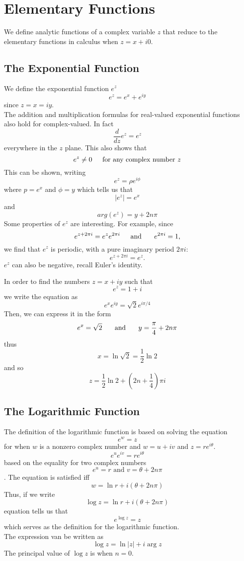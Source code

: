 \chapter{Elementary Functions}
We define analytic functions of a complex variable $ z $ that reduce to the elementary functions in calculus when $ z = x + i0 $. 

\section{The Exponential Function}
We define the exponential function $ e^z $
\[ e^z = e^x + e^{iy} \]
since $ z = x = iy $. \\
The addition and multiplication formulas for real-valued exponential functions also hold for complex-valued. In fact 
\[ \frac{d}{dz} e^z = e^z \] everywhere in the $ z $ plane. This also shows that 
\[ e^z \neq 0 \indent \text{for any complex number $ z $}\]
This can be shown, writing 
\[ e^z = \rho e^{i\phi} \] where $ p = e^x $ and $ \phi = y $
which tells us that 
\[ |e^z| = e^x \] and \[ arg(e^z) = y + 2n \pi \] 
Some properties of $ e^z $ are interesting. For example, since 
\[ e^{z+2\pi i} = e^z e^{2\pi i} \text{\indent and \indent }e^{2 \pi i}= 1,\]
we find that $ e^z $ is periodic, with a pure imaginary period $ 2 \pi i $: 
\[ e^{z+2 \pi i} = e^z. \]
$ e^z $ can also be negative, recall Euler's identity. 
\begin{example}
	In order to find the numbers $ z = x +iy $ such that \[ e^z = 1 + i \] we write the equation as 
	\[ e^xe^{iy} = \sqrt{2}e^{i \pi / 4} \] Then, we can express it in the form 
	\[ e^x = \sqrt{2} \text{ \indent and \indent} y = \dfrac{\pi}{4}+2n\pi\] 
	thus 
	\[ x = \ln \sqrt{2} = \dfrac{1}{2} \ln 2 \] and so 
	\[ z = \dfrac{1}{2} \ln 2 + \left(2n + \dfrac{1}{4}\right)\pi i \]
\end{example}
\section{The Logarithmic Function}
The definition of the logarithmic function is based on solving the equation 
\[ e^w = z \] for when $ w $ is a nonzero complex number and $ w = u + iv $ and $ z = re^{i \theta} $. \[ e^ue^{iv} = re^{i \theta} \] based on the equality for two complex numbers 
\[ e^u = r \text{  and  } v=\theta + 2n\pi \]. The equation is satisfied iff \[ w = \ln r + i(\theta + 2n \pi) \] Thus, if we write 
\[ \log z = \ln r + i(\theta + 2n\pi) \] equation tells us that 
\[ e^{\log z} = z \] which serves as the definition for the logarithmic function. \\ \indent The expression van be written as \[ \log z = \ln |z| + i \arg z \] The principal value of $ \log z $ is when $ n =0 $.

